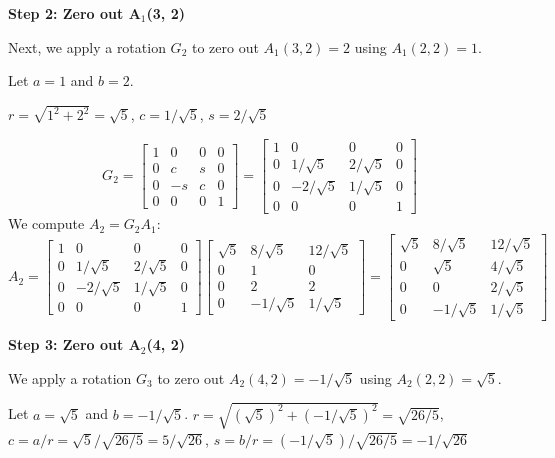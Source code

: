 \documentclass{article}
\newcommand{\0}{{\mathbf{0}}} %
\begin{document}
\textbf{Step 2: Zero out A\(_1\)(3, 2)}

Next, we apply a rotation $G_2$ to zero out $A_1(3, 2) = 2$ using $A_1(2, 2) = 1$.

Let $a = 1$ and $b = 2$.

$r = \sqrt{1^2 + 2^2} = \sqrt{5}$,
$c = 1/\sqrt{5}$,
$s = 2/\sqrt{5}$

$$ G_2 =
\begin{bmatrix} 1 & 0 & 0 & 0 \\ 0 & c & s & 0 \\ 0 & -s & c & 0 \\ 0 & 0 & 0 & 1
\end{bmatrix} =
\begin{bmatrix} 1 & 0 & 0 & 0 \\ 0 & 1/\sqrt{5} & 2/\sqrt{5} & 0 \\ 0 & -2/\sqrt{5} & 1/\sqrt{5} & 0 \\ 0 & 0 & 0 & 1
\end{bmatrix} $$
We compute $A_2 = G_2 A_1$:
$$ A_2 =
\begin{bmatrix} 1 & 0 & 0 & 0 \\ 0 & 1/\sqrt{5} & 2/\sqrt{5} & 0 \\ 0 & -2/\sqrt{5} & 1/\sqrt{5} & 0 \\ 0 & 0 & 0 & 1
\end{bmatrix}
\begin{bmatrix} \sqrt{5} & 8/\sqrt{5} & 12/\sqrt{5} \\ 0 & 1 & 0 \\ 0 & 2 & 2 \\ 0 & -1/\sqrt{5} & 1/\sqrt{5}
\end{bmatrix} =
\begin{bmatrix} \sqrt{5} & 8/\sqrt{5} & 12/\sqrt{5} \\ 0 & \sqrt{5} & 4/\sqrt{5} \\ 0 & 0 & 2/\sqrt{5} \\ 0 & -1/\sqrt{5} & 1/\sqrt{5}
\end{bmatrix} $$

\textbf{Step 3: Zero out A\(_2\)(4, 2)}

We apply a rotation $G_3$ to zero out $A_2(4, 2) = -1/\sqrt{5}$ using $A_2(2, 2) = \sqrt{5}$.

Let $a = \sqrt{5}$ and $b = -1/\sqrt{5}$.
$r = \sqrt{(\sqrt{5})^2 + (-1/\sqrt{5})^2} = \sqrt{26/5}$,
$c = a/r = \sqrt{5} / \sqrt{26/5} = 5/\sqrt{26}$,
$s = b/r = (-1/\sqrt{5}) / \sqrt{26/5} = -1/\sqrt{26}$
\end{document}
